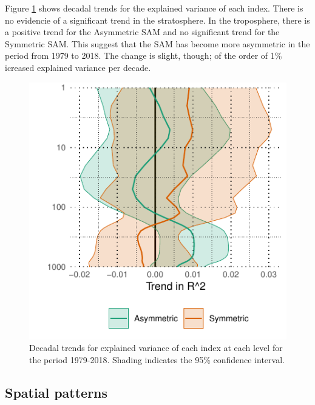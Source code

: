 \documentclass[]{ametsocV5}
\begin{document}
Figure \ref{fig:r-squared-trend} shows decadal trends for the explained
variance of each index. There is no evidencie of a significant trend in
the stratosphere. In the troposphere, there is a positive trend for the
Asymmetric SAM and no significant trend for the Symmetric SAM. This
suggest that the SAM has become more asymmetric in the period from 1979
to 2018. The change is slight, though; of the order of 1\% icreased
explained variance per decade.

\begin{figure}
\includegraphics{r-squared-trend-1} \caption[Decadal trends for explained variance of each index at each level for the period 1979-2018]{Decadal trends for explained variance of each index at each level for the period 1979-2018. Shading indicates the 95\% confidence interval.}\label{fig:r-squared-trend}
\end{figure}

\subsection{Spatial patterns}
\end{document}
